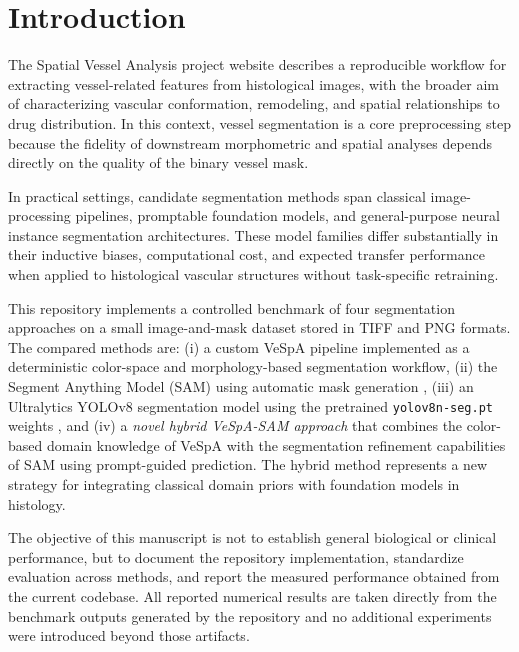 \section{Introduction}
The Spatial Vessel Analysis project website describes a reproducible workflow for extracting vessel-related features from histological images, with the broader aim of characterizing vascular conformation, remodeling, and spatial relationships to drug distribution. In this context, vessel segmentation is a core preprocessing step because the fidelity of downstream morphometric and spatial analyses depends directly on the quality of the binary vessel mask.

In practical settings, candidate segmentation methods span classical image-processing pipelines, promptable foundation models, and general-purpose neural instance segmentation architectures. These model families differ substantially in their inductive biases, computational cost, and expected transfer performance when applied to histological vascular structures without task-specific retraining.

This repository implements a controlled benchmark of four segmentation approaches on a small image-and-mask dataset stored in TIFF and PNG formats. The compared methods are: (i) a custom VeSpA pipeline implemented as a deterministic color-space and morphology-based segmentation workflow, (ii) the Segment Anything Model (SAM) using automatic mask generation \cite{kirillov2023sam,segmentanything_repo}, (iii) an Ultralytics YOLOv8 segmentation model using the pretrained \texttt{yolov8n-seg.pt} weights \cite{ultralytics_repo}, and (iv) a \textit{novel hybrid VeSpA-SAM approach} that combines the color-based domain knowledge of VeSpA with the segmentation refinement capabilities of SAM using prompt-guided prediction. The hybrid method represents a new strategy for integrating classical domain priors with foundation models in histology.

The objective of this manuscript is not to establish general biological or clinical performance, but to document the repository implementation, standardize evaluation across methods, and report the measured performance obtained from the current codebase. All reported numerical results are taken directly from the benchmark outputs generated by the repository and no additional experiments were introduced beyond those artifacts.
